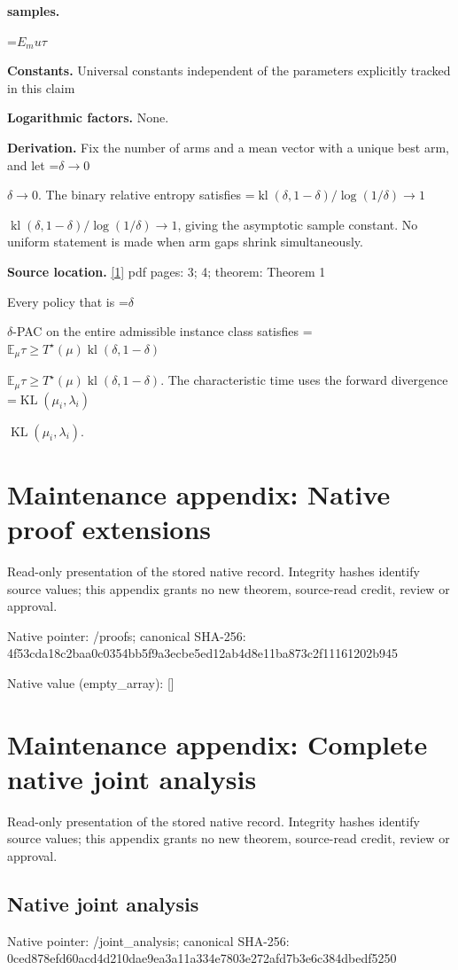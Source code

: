 \documentclass[10pt,a4paper]{article}
\newcommand{\AtlasMath}[1]{\par\begingroup\centering\setbox0=\hbox{$\displaystyle #1$}\ifdim\wd0>1.4\linewidth\typeout{ATLAS WIDE FORMULA: \the\wd0}\fi\ifdim\wd0>\linewidth\resizebox{\linewidth}{!}{\box0}\else\box0\fi\par\endgroup}
\newcommand{\AtlasInlineMath}[1]{\begingroup\setbox0=\hbox{$#1$}\ifdim\wd0>.4\linewidth\endgroup\AtlasMath{#1}\else\endgroup$#1$\fi}
\begin{document}
\textbf{samples.}

\AtlasMath{E_mu \tau}
\textbf{Constants.} Universal constants independent of the parameters explicitly tracked in this claim

\textbf{Logarithmic factors.} None.

\textbf{Derivation.} Fix the number of arms and a mean vector with a unique best arm, and let \AtlasInlineMath{\delta\to0}. The binary relative entropy satisfies \AtlasInlineMath{\operatorname{kl}(\delta,1-\delta)/\log(1/\delta)\to1}, giving the asymptotic sample constant. No uniform statement is made when arm gaps shrink simultaneously.

\textbf{Source location.} \href{https://proceedings.mlr.press/v49/garivier16a.pdf}{[1]} pdf pages: 3; 4; theorem: Theorem 1

Every policy that is \AtlasInlineMath{\delta}-PAC on the entire admissible instance class satisfies \AtlasInlineMath{\mathbb E_\mu\tau\ge T^\star(\mu)\operatorname{kl}(\delta,1-\delta)}. The characteristic time uses the forward divergence \AtlasInlineMath{\operatorname{KL}(\mu_i,\lambda_i)}.

\section{Maintenance appendix: Native proof extensions}
Read-only presentation of the stored native record. Integrity hashes identify source values; this appendix grants no new theorem, source-read credit, review or approval.

Native pointer: /proofs; canonical SHA-256: 4f53cda18c2baa0c0354bb5f9a3ecbe5ed12ab4d8e11ba873c2f11161202b945

Native value (empty\_\allowbreak{}array): []

\section{Maintenance appendix: Complete native joint analysis}
Read-only presentation of the stored native record. Integrity hashes identify source values; this appendix grants no new theorem, source-read credit, review or approval.

\subsection{Native joint analysis}
Native pointer: /joint\_\allowbreak{}analysis; canonical SHA-256: 0ced878efd60acd4d210dae9ea3a11a334e7803e272afd7b3e6c384dbedf5250
\end{document}
